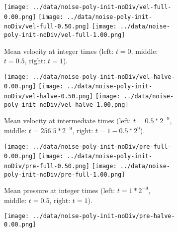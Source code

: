 \documentclass[tikz]{standalone}
\begin{document}
\begin{figure}
\vspace*{-1em}
\begin{subfigure}[t]{1.00\textwidth} 
       \hspace*{-3.7em} \texttt{[image: ../data/noise-poly-init-noDiv/vel-full-0.00.png]}%
       \hspace*{-7.4em} \texttt{[image: ../data/noise-poly-init-noDiv/vel-full-0.50.png]}%
       \hspace*{-7.4em} \texttt{[image: ../data/noise-poly-init-noDiv/vel-full-1.00.png]}
       \vspace*{-3em}
        \caption{Mean velocity at integer times (left: $t = 0$, middle: $t = 0.5 $, right: $t = 1$).}
\end{subfigure}
\vspace*{-1em}
\begin{subfigure}[t]{1.00\textwidth} 
       \hspace*{-3.7em} \texttt{[image: ../data/noise-poly-init-noDiv/vel-halve-0.00.png]}%
       \hspace*{-7.4em} \texttt{[image: ../data/noise-poly-init-noDiv/vel-halve-0.50.png]}%
       \hspace*{-7.4em} \texttt{[image: ../data/noise-poly-init-noDiv/vel-halve-1.00.png]}
       \vspace*{-3em}
        \caption{Mean velocity at intermediate times (left: $t = 0.5*2^{-9}$, middle: $t = 256.5*2^{-9} $, right: $t = 1 - 0.5*2^9$).}
\end{subfigure}
\vspace*{-1em}
\begin{subfigure}[t]{1.00\textwidth} 
       \hspace*{-3.7em} \texttt{[image: ../data/noise-poly-init-noDiv/pre-full-0.00.png]}%
       \hspace*{-7.4em} \texttt{[image: ../data/noise-poly-init-noDiv/pre-full-0.50.png]}%
       \hspace*{-7.4em} \texttt{[image: ../data/noise-poly-init-noDiv/pre-full-1.00.png]}
       \vspace*{-3em}
        \caption{Mean pressure at integer times (left: $t = 1*2^{-9}$, middle: $t = 0.5 $, right: $t = 1$).}
\end{subfigure}
\vspace*{-1em}
\begin{subfigure}[t]{1.00\textwidth} 
       \hspace*{-3.7em} \texttt{[image: ../data/noise-poly-init-noDiv/pre-halve-0.00.png]}%

\end{subfigure}
\end{figure}
\end{document}
